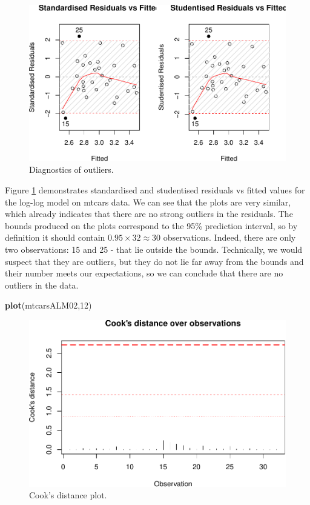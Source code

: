 \documentclass[
]{book}
\newenvironment{Shaded}{\begin{snugshade}}{\end{snugshade}}
\newcommand{\DecValTok}[1]{\textcolor[rgb]{0.00,0.00,0.81}{#1}}
\newcommand{\FunctionTok}[1]{\textcolor[rgb]{0.13,0.29,0.53}{\textbf{#1}}}
\newcommand{\NormalTok}[1]{#1}
\theoremstyle{definition}
\theoremstyle{definition}
\theoremstyle{definition}
\theoremstyle{definition}
\theoremstyle{remark}
\begin{document}
\begin{figure}
\centering
\includegraphics{Svetunkov---Statistics-for-Business-Analytics_files/figure-latex/diagnostics05-1.pdf}
\caption{\label{fig:diagnostics05}Diagnostics of outliers.}
\end{figure}

Figure \ref{fig:diagnostics05} demonstrates standardised and studentised residuals vs fitted values for the log-log model on mtcars data. We can see that the plots are very similar, which already indicates that there are no strong outliers in the residuals. The bounds produced on the plots correspond to the 95\% prediction interval, so by definition it should contain \(0.95\times 32 \approx 30\) observations. Indeed, there are only two observations: 15 and 25 - that lie outside the bounds. Technically, we would suspect that they are outliers, but they do not lie far away from the bounds and their number meets our expectations, so we can conclude that there are no outliers in the data.

\begin{Shaded}
\begin{Highlighting}[]
\FunctionTok{plot}\NormalTok{(mtcarsALM02,}\DecValTok{12}\NormalTok{)}
\end{Highlighting}
\end{Shaded}

\begin{figure}
\centering
\includegraphics{Svetunkov---Statistics-for-Business-Analytics_files/figure-latex/diagnostics06-1.pdf}
\caption{\label{fig:diagnostics06}Cook's distance plot.}
\end{figure}
\end{document}
